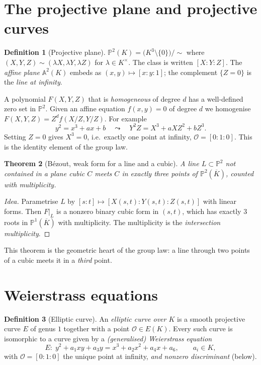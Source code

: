 \documentclass[11pt,a4paper,oneside]{book}
\theoremstyle{plain}
\newtheorem{theorem}{Theorem}[chapter]
\theoremstyle{definition}
\newtheorem{definition}[theorem]{Definition}
\theoremstyle{remark}
\renewcommand{\P}{\mathbb{P}}
\newcommand{\A}{\mathbb{A}}
\newcommand{\Oinf}{\mathcal{O}}
\newcommand{\Kbar}{\overline{K}}
\begin{document}
\section{The projective plane and projective curves}

\begin{definition}[Projective plane]
$\P^2(K)=\big(K^3\setminus\{0\}\big)/\!\sim$ where $(X,Y,Z)\sim(\lambda X,\lambda Y,\lambda Z)$ for $\lambda\in K^\times$. The class is written $[X:Y:Z]$.
The \emph{affine plane} $\A^2(K)$ embeds as $(x,y)\mapsto[x:y:1]$; the complement $\{Z=0\}$ is the \emph{line at infinity}.
\end{definition}

A polynomial $F(X,Y,Z)$ that is \emph{homogeneous} of degree $d$ has a well-defined zero set in $\P^2$. Given an affine equation $f(x,y)=0$ of degree $d$ we
homogenise $F(X,Y,Z)=Z^df(X/Z,Y/Z)$. For example
\[
y^2=x^3+ax+b \quad\leadsto\quad Y^2Z=X^3+aXZ^2+bZ^3 .
\]
Setting $Z=0$ gives $X^3=0$, i.e.\ exactly one point at infinity, $\Oinf=[0:1:0]$. This is the identity element of the group law.

\begin{theorem}[B\'ezout, weak form for a line and a cubic]\label{thm:bezout}
A line $L\subset\P^2$ not contained in a plane cubic $C$ meets $C$ in exactly three points of $\P^2(\Kbar)$, counted with multiplicity.
\end{theorem}
\begin{proof}[Idea]
Parametrise $L$ by $[s:t]\mapsto [X(s,t):Y(s,t):Z(s,t)]$ with linear forms. Then $F|_L$ is a nonzero binary cubic form in $(s,t)$, which has exactly $3$ roots in $\P^1(\Kbar)$ with multiplicity. The multiplicity is the \emph{intersection multiplicity}.
\end{proof}

This theorem is the geometric heart of the group law: a line through two points of a cubic meets it in a \emph{third} point.

\section{Weierstrass equations}

\begin{definition}[Elliptic curve]\label{def:EC}
An \emph{elliptic curve over $K$} is a smooth projective curve $E$ of genus $1$ together with a point $\Oinf\in E(K)$.
Every such curve is isomorphic to a curve given by a \emph{(generalised) Weierstrass equation}
\begin{equation}\label{eq:Weierstrass-general}
E:\; y^2+a_1xy+a_3y=x^3+a_2x^2+a_4x+a_6,\qquad a_i\in K,
\end{equation}
with $\Oinf=[0:1:0]$ the unique point at infinity, \emph{and nonzero discriminant}\textup{ (below)}.
\end{definition}
\end{document}
